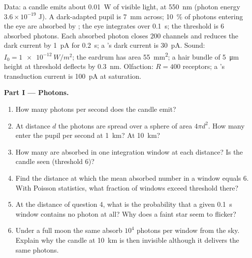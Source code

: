 \begin{problem}
\label{pb:b3:sensory-systems:1}
Data: a candle emits about \qty{0.01}{W} of visible light, at
\qty{550}{nm} (photon energy $3.6\times 10^{-19}$ J). A dark-adapted
pupil is \qty{7}{mm} across; \qty{10}{\%} of photons entering the eye
are absorbed by ; the eye integrates over \qty{0.1}{s}; the
threshold is $6$ absorbed photons. Each absorbed photon closes $200$
channels and reduces the dark current by \qty{1}{pA} for \qty{0.2}{s};
a 's dark current is \qty{30}{pA}. Sound: $I_{0} =
\qty{1e-12}{W/m^2}$; the eardrum has area \qty{55}{mm^2}; a hair bundle
of \qty{5}{\micro m} height at threshold deflects by \qty{0.3}{nm}.
Olfaction: $R = 400$ receptors; a 's transduction current is
\qty{100}{pA} at saturation.

\medskip
\noindent\textbf{Part I --- Photons.}
\begin{enumerate}
  \item How many photons per second does the candle emit?
  \item At distance $d$ the photons are spread over a sphere of area
        $4\pi d^{2}$. How many enter the pupil per second at
        \qty{1}{km}? At \qty{10}{km}?
  \item How many are absorbed in one integration window at each
        distance? Is the candle seen (threshold $6$)?
  \item Find the distance at which the mean absorbed number in a window
        equals $6$. With Poisson statistics, what fraction of windows
        exceed threshold there?
  \item At the distance of question 4, what is the probability that a
        given \qty{0.1}{s} window contains no photon at all? Why does a
        faint star seem to flicker?
  \item Under a full moon the same  absorb $10^{4}$ photons per
        window from the sky. Explain why the candle at \qty{10}{km} is
        then invisible although it delivers the same photons.
\end{enumerate}


\end{problem}
